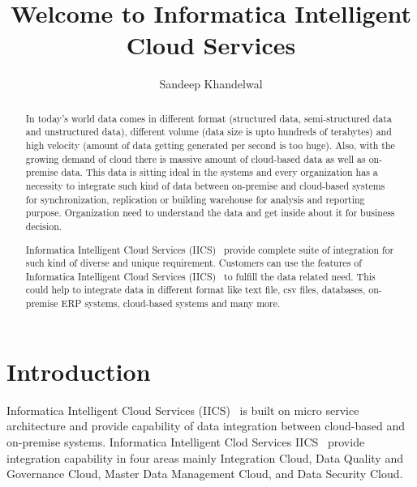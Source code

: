 \title{Welcome to Informatica Intelligent Cloud Services}

\author{Sandeep Khandelwal}

\renewcommand{\shortauthors}{S. Khandelwal}

\begin{abstract}
	
In today's world data comes in different format (structured data,
semi-structured data and unstructured data), different volume (data size is upto
hundreds of terabytes) and high velocity (amount of data getting
generated per second is too huge). Also, with the growing demand of cloud there is massive amount of
cloud-based data as well as on-premise data. This data is sitting ideal in the systems and every organization has a necessity to integrate such kind of data between on-premise and cloud-based
systems for synchronization, replication or building warehouse for
analysis and reporting purpose. Organization need to understand the data and get inside about it for business decision. 

Informatica Intelligent Cloud Services
(IICS)~\cite{hid-sp18-511-iics} provide complete suite of integration
for such kind of diverse and unique requirement. Customers can use the features of Informatica Intelligent Cloud Services (IICS)~\cite{hid-sp18-511-iics} to fulfill the data related need. This could help to integrate data in different format like text file, csv files, databases, on-premise ERP systems, cloud-based systems and many more.

\end{abstract}



\maketitle


\section{Introduction}

Informatica Intelligent Cloud Services (IICS)~\cite{hid-sp18-511-iics} is built on micro service
architecture and provide capability of data integration between
cloud-based and on-premise systems. Informatica Intelligent Clod
Services IICS~\cite{hid-sp18-511-iics} provide integration capability
in four areas mainly Integration Cloud, Data Quality and Governance
Cloud, Master Data Management Cloud, and Data Security Cloud.

